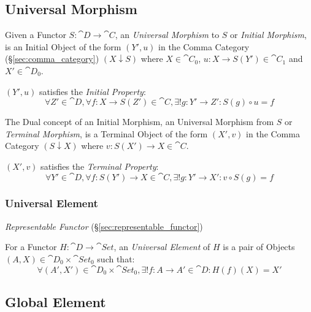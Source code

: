 \subsection{Universal Morphism}\label{sec:universal_morphism}

Given a Functor $S: \cat{D} \rightarrow \cat{C}$, an
\emph{Universal Morphism} to $S$ or \emph{Initial Morphism}, is an
Initial Object of the form $(Y',u)$ in the Comma Category
(\S\ref{sec:comma_category}) $(X \downarrow S)$ where $X \in
\cat{C}_0$, $u : X \rightarrow S(Y') \in \cat{C}_1$ and $X' \in
\cat{D}_0$.

$(Y', u)$ satisfies the \emph{Initial Property}:
\[
  \forall Z' \in \cat{D}, \forall f : X \rightarrow S(Z') \in
  \cat{C}, \exists! g : Y' \rightarrow Z' : S(g) \circ u = f
\]

The Dual concept of an Initial Morphism, an Universal Morphism from
$S$ or \emph{Terminal Morphism}, is a Terminal Object of the form
$(X',v)$ in the Comma Category $(S \downarrow X)$ where $v : S(X')
\rightarrow X \in \cat{C}$.

$(X',v)$ satisfies the \emph{Terminal Property}:
\[
  \forall Y' \in \cat{D}, \forall f : S(Y') \rightarrow X \in
  \cat{C}, \exists! g : Y' \rightarrow X' : v \circ S(g) = f
\]




\subsubsection{Universal Element}\label{sec:universal_element}

\emph{Representable Functor} (\S\ref{sec:representable_functor})

For a Functor $H : \cat{D} \rightarrow \cat{Set}$, an
\emph{Universal Element} of $H$ is a pair of Objects $(A,X) \in
\cat{D}_0 \times \cat{Set}_0$ such that:
\[
  \forall (A',X') \in \cat{D}_0 \times \cat{Set}_0,
  \exists! f : A \rightarrow A' \in \cat{D} : H(f)(X) = X'
\]



\subsection{Global Element}\label{sec:global_element}

